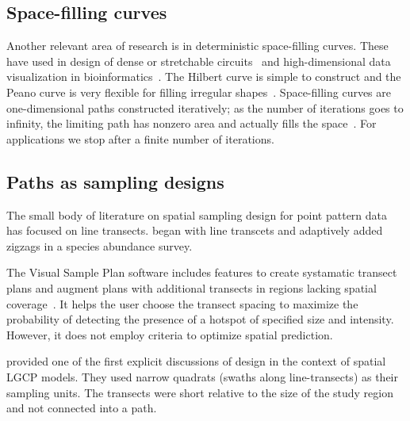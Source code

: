 \documentclass[review]{elsarticle}
\begin{document}
\subsection{Space-filling curves}

Another relevant area of research is in deterministic space-filling curves.
These have used in design of dense or stretchable
circuits~\citep{ogorzalek,mazhang} and high-dimensional data visualization
in bioinformatics~\citep{hilbertvis}. The Hilbert curve is simple to construct
and the Peano curve is very flexible for filling irregular
shapes~\citep{fanetal}. Space-filling curves are one-dimensional paths
constructed iteratively; as the number of iterations goes to infinity, the
limiting path has nonzero area and actually fills the space~\citep{sagan}. For
applications we stop after a finite number of iterations.


\subsection{Paths as sampling designs}

The small body of literature on spatial sampling design for point pattern
data has focused on line transects. \citet{pollard} began with line transcets
and adaptively added zigzags in a species abundance survey.

The Visual Sample Plan software includes features to create systamatic transect
plans and augment plans with additional transects in regions lacking spatial
coverage~\citep{vspguide}. It helps the user choose the transect spacing to
maximize the probability of detecting the presence of a hotspot of specified
size and intensity. However, it does not employ criteria to optimize spatial
prediction.

\citet{liuvanhatalo} provided one of the first explicit discussions of design
in the context of spatial LGCP models. They used narrow quadrats (swaths along
line-transects) as their sampling units. The transects were short relative to
the size of the study region and not connected into a path.




\end{document}

